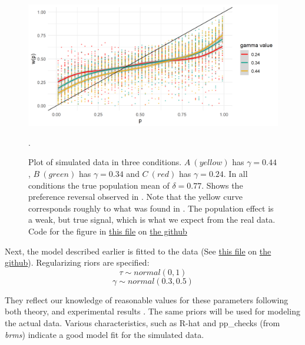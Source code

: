 \documentclass[12pt]{article}
\begin{document}
\begin{figure}[H]
	\includegraphics[width = \linewidth]{../Figures/simulated.png}
	\caption{Plot of simulated data in three
		conditions. $A \: (yellow)$ has
		$\gamma = 0.44$,
		$B \: (green)$ has $\gamma = 0.34$ and
		$C \: (red)$ has $\gamma = 0.24$.
		In all conditions
		the true population mean of
		$\delta = 0.77$. Shows the preference
		reversal observed in
	\textcite{rottenstreich2001money}. Note
	that the yellow curve corresponds
	roughly to what was found in
	\textcite{gonzalez1999shape}.
	The population effect is a
	weak, but true signal, which is
what we expect from the real data. Code for the figure in
		\href{https://github.com/victor-m-p/BayesianDecisionWeights/blob/main/Code/2_check_simulated.Rmd}{this
		file} on
		\href{https://github.com/victor-m-p/BayesianDecisionWeights}{the github}}.
\end{figure}

Next, the model described earlier is fitted
to the data (See
\href{https://github.com/victor-m-p/BayesianDecisionWeights/blob/main/Code/3_toy_model.Rmd}{this
file} on \href{https://github.com/victor-m-p/BayesianDecisionWeights}{the
github}). Regularizing riors are specified:
\[
	\tau \sim normal(0, 1)
\]
\[
	\gamma \sim normal(0.3, 0.5)
\]

They reflect our knowledge of reasonable values for
these parameters following both theory, and
experimental results \autocite{gonzalez1999shape}.
The same priors will be used for
modeling the actual data. Various characteristics,
such as R-hat and pp\_checks (from \emph{brms})
indicate a good model fit for the simulated data. \\
\end{document}
